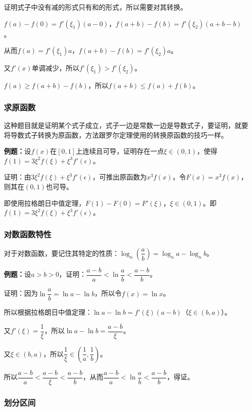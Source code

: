 证明式子中没有减的形式只有和的形式，所以需要对其转换。

$f(a)-f(0)=f'(\xi_1)(a-0)$，$f(a+b)-f(b)=f'(\xi_2)(a+b-b)$。

从而$f(a)=f'(\xi_1)a$，$f(a+b)-f(b)=f'(\xi_2)a$。

又$f'(x)$单调减少，所以$f'(\xi_1)>f'(\xi_2)$。

$f(a)\geqslant f(a+b)-f(b)$，所以$f(a+b)\leqslant f(a)+f(b)$。

\subsubsection{求原函数}

这种题目就是证明某个式子成立，式子一边是常数一边是导数式子，要证明，就要将导数式子转换为原函数，方法跟罗尔定理使用的转换原函数的技巧一样。

\textbf{例题：}设$f(x)$在$[0,1]$上连续且可导，证明存在一点$\xi\in(0,1)$，使得$f(1)=3\xi^2f(\xi)+\xi^3f'(\epsilon)$。

证明：由$3\xi^2f(\xi)+\xi^3f'(\epsilon)$，可推出原函数为$x^3f(x)$，令$F(x)=x^3f(x)$，则其在$(0,1)$也可导。

即使用拉格朗日中值定理，$F(1)-F(0)=F'(\xi)$，$\xi\in(0,1)$。即$f(1)=3\xi^2f(\xi)+\xi^3f'(\epsilon)$。

\subsubsection{对数函数特性}

对于对数函数，要记住其特定的性质：$\log_n(\dfrac{a}{b})=\log_na-\log_nb$。

\textbf{例题：}设$a>b>0$，证明：$\dfrac{a-b}{a}<\ln\dfrac{a}{b}<\dfrac{a-b}{b}$。

证明：因为$\ln\dfrac{a}{b}=\ln a-\ln b$，所以令$f(x)=\ln x$。

所以根据拉格朗日中值定理：$\ln a-\ln b=f'(\xi)(a-b)$（$\xi\in(b,a)$）。

又$f'(\xi)=\dfrac{1}{\xi}$，所以$\ln a-\ln b=\dfrac{a-b}{\xi}$。

又$\xi\in(b,a)$，所以$\dfrac{1}{\xi}\in(\dfrac{1}{a},\dfrac{1}{b})$。

所以$\dfrac{a-b}{a}<\dfrac{a-b}{\xi}<\dfrac{a-b}{b}$，从而$\dfrac{a-b}{a}<\ln\dfrac{a}{b}<\dfrac{a-b}{b}$，得证。

\subsubsection{划分区间}

